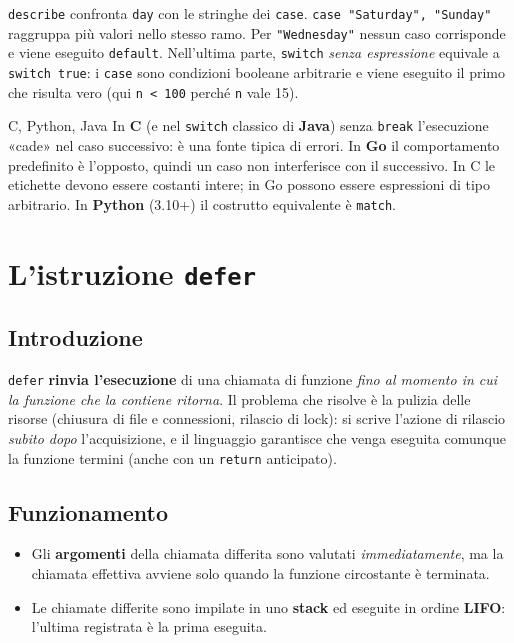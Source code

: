 \documentclass[11pt,a4paper]{report}
\newcommand{\cod}[1]{\texttt{#1}}
\begin{document}
\cod{describe} confronta \cod{day} con le stringhe dei \cod{case}.
\cod{case "Saturday", "Sunday"} raggruppa più valori nello stesso ramo.
Per \cod{"Wednesday"} nessun caso corrisponde e viene eseguito \cod{default}.
Nell'ultima parte, \cod{switch} \emph{senza espressione} equivale a
\cod{switch true}: i \cod{case} sono condizioni booleane arbitrarie e viene
eseguito il primo che risulta vero (qui \cod{n < 100} perché \cod{n} vale 15).

\begin{confronto}{C, Python, Java}
In \textbf{C} (e nel \cod{switch} classico di \textbf{Java}) senza \cod{break}
l'esecuzione «cade» nel caso successivo: è una fonte tipica di errori. In
\textbf{Go} il comportamento predefinito è l'opposto, quindi un caso non
interferisce con il successivo. In C le etichette devono essere costanti
intere; in Go possono essere espressioni di tipo arbitrario. In
\textbf{Python} (3.10+) il costrutto equivalente è \cod{match}.
\end{confronto}

\section{L'istruzione \texttt{defer}}\label{sec:defer}

\subsection{Introduzione}

\cod{defer} \textbf{rinvia l'esecuzione} di una chiamata di funzione \emph{fino al
momento in cui la funzione che la contiene ritorna}. Il problema che risolve è la
pulizia delle risorse (chiusura di file e connessioni, rilascio di lock): si
scrive l'azione di rilascio \emph{subito dopo} l'acquisizione, e il
linguaggio garantisce che venga eseguita comunque la funzione termini
(anche con un \cod{return} anticipato).

\subsection{Funzionamento}

\begin{itemize}
  \item Gli \textbf{argomenti} della chiamata differita sono valutati
        \emph{immediatamente}, ma la chiamata effettiva avviene solo
        quando la funzione circostante è terminata.
  \item Le chiamate differite sono impilate in uno \textbf{stack} ed eseguite in
        ordine \textbf{LIFO}: l'ultima registrata è la prima eseguita.
\end{itemize}
\end{document}
